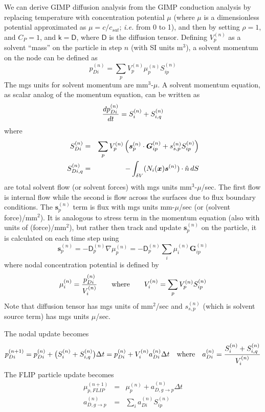 \documentclass[11pt]{article}
\renewcommand{\vec}[1]{\boldsymbol{#1}}
\newcommand{\tens}[1]{\boldsymbol{\mathsf{#1}}}
\begin{document}
We can derive GIMP diffusion analysis from the GIMP conduction analysis by replacing temperature with concentration potential $\mu$ (where $\mu$ is a dimensionless potential approximated as $\mu=c/c_{sat}$; {\em i.e.} from 0 to 1), and then by setting $\rho=1$, and $C_P=1$, and $\tens k = \tens D$, where $\tens D$ is the diffusion tensor. Defining $V_{p}^{(n)}$ as a solvent ``mass'' on the particle in step $n$ (with SI units m$^3$), a solvent momentum on the node can be defined as
\begin{equation}
      p_{Di}^{(n)} = \sum_p  V_{p}^{(n)} \mu_p^{(n)} S^{(n)}_{ip} 
\end{equation}
The mgs units for solvent momentum are mm$^3$-$\mu$. A solvent momentum equation, as scalar analog of the momentum equation, can be written as
\begin{equation}
     {d p_{Di}^{(n)}\over dt} = S_{i}^{(n)} + S_{i,q}^{(n)}
\end{equation}
where
\begin{eqnarray}
     S_{Di}^{(n)} & = & \sum_p V_p^{(n)}  \left(\vec s_p^{(n)}\cdot \vec G^{(n)}_{ip}  + s_{s,p}^{(n)} S^{(n)}_{ip} \right) \\
     S_{Di,q}^{(n)} & = & -  \int_{\delta V} (N_i(\vec x)\vec s^{(n)})\cdot \hat n \thinspace dS 
\end{eqnarray}
are total solvent flow (or solvent forces) with mgs units mm$^3$-$\mu$/sec. The first flow is internal flow while the second is flow across the surfaces due to flux boundary conditions. The $\vec s_p^{(n)}$ term is flux with mgs units mm-$\mu$/sec (or (solvent force)/mm$^2$). It is analogous to stress term in the momentum equation (also with units of (force)/mm$^2$), but rather then track and update $\vec s_p^{(n)}$ on the particle, it is calculated on each time step using
\begin{equation}
    \vec s_p^{(n)} = - \tens D_p^{(n)} \nabla \mu_p^{(n)} = - \tens D_p^{(n)}\sum_i \tens  \mu_i^{(n)} \vec G^{(n)}_{ip}
\end{equation}
where nodal concentration potential is defined by
\begin{equation}
       \mu_i^{(n)} = {p_{Di}^{(n)} \over V_{i}^{(n)}} \qquad {\rm where } \qquad V_{i}^{(n)} = \sum_p  V_{p}^{(n)} S^{(n)}_{ip}  
\end{equation}
Note that diffusion tensor has mgs units of mm$^2$/sec and $s_{s,p}^{(n)}$ (which is solvent source term) has mgs units $\mu$/sec.

The nodal update becomes
\begin{equation}
     p_{Di}^{(n+1)} = p_{Di}^{(n)} +  \bigl(S_{i}^{(n)} + S_{i,q}^{(n)}\bigr)\Delta t = p_{Di}^{(n)} +  V_{i}^{(n)} a_{Di}^{(n)}\Delta t
     \quad{\rm where}\quad
     a_{Di}^{(n)} =  { S_{i}^{(n)} + S_{i,q}^{(n)}  \over V_{i}^{(n)}}
\end{equation}
The FLIP particle update becomes
\begin{eqnarray}
     \mu_{p,FLIP}^{(n+1)}  & = & \mu_p^{(n)} + a_{D,g\to p}^{(n)}\Delta t   \\
      a_{D,g\to p}^{(n)} & = & \sum_i a_{Di}^{(n)} S_{ip}^{(n)}    \\
\end{eqnarray}
\end{document}
